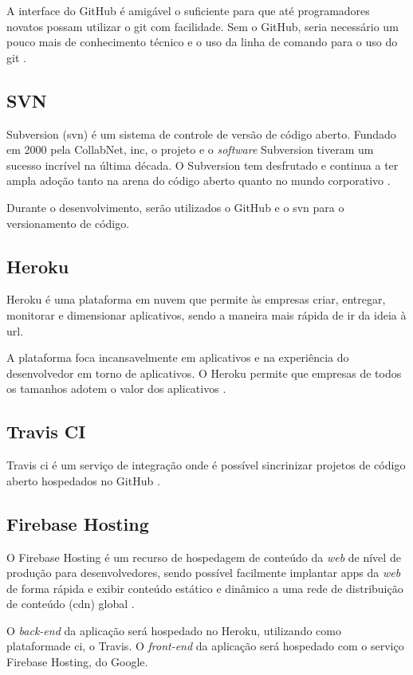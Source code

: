 A interface do GitHub é amigável o suficiente para que até programadores novatos possam utilizar o \gls{git} com facilidade. Sem o GitHub, seria necessário um pouco mais de conhecimento técnico e o uso da linha de comando para o uso do \gls{git} \cite{github:2021}.

\subsection{SVN}
Subversion (\ac{svn}) é um sistema de controle de versão de código aberto. Fundado em 2000 pela CollabNet, \ac{inc}, o projeto e o \textit{\gls{software}} Subversion tiveram um sucesso incrível na última década. O Subversion tem desfrutado e continua a ter ampla adoção tanto na arena do código aberto quanto no mundo corporativo \cite{svn:2021}.


Durante o desenvolvimento, serão utilizados o GitHub e o \ac{svn} para o versionamento de código.

\subsection{Heroku}
Heroku é uma plataforma em nuvem que permite às empresas criar, entregar, monitorar e dimensionar aplicativos, sendo a maneira mais rápida de ir da ideia à \ac{url}.


A plataforma foca incansavelmente em aplicativos e na experiência do desenvolvedor em torno de aplicativos. O Heroku permite que empresas de todos os tamanhos adotem o valor dos aplicativos \cite{heroku:2021}.

\subsection{Travis CI}
Travis \ac{ci} é um serviço de integração onde é possível sincrinizar projetos de código aberto hospedados no GitHub \cite{travis:2021}.

\subsection{Firebase Hosting}
O Firebase Hosting é um recurso de hospedagem de conteúdo da \textit{\gls{web}} de nível de produção para desenvolvedores, sendo possível facilmente implantar apps da \textit{web} de forma rápida e exibir conteúdo estático e dinâmico a uma rede de distribuição de conteúdo (\ac{cdn}) global \cite{hosting:2020}.


O \textit{\gls{back-end}} da aplicação será hospedado no Heroku, utilizando como plataformade \ac{ci}, o Travis. O \textit{\gls{front-end}} da aplicação será hospedado com o serviço Firebase Hosting, do Google.


